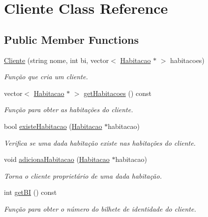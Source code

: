 \hypertarget{class_cliente}{}\section{Cliente Class Reference}
\label{class_cliente}
\subsection*{Public Member Functions}
\begin{DoxyCompactItemize}
\item 
\hyperlink{class_cliente_a2bccaf416e225c0f925e69ec132f415a}{Cliente} (string nome, int bi, vector$<$ \hyperlink{class_habitacao}{Habitacao} $\ast$ $>$ habitacoes)
\begin{DoxyCompactList}\small\item\em Função que cria um cliente. \end{DoxyCompactList}\item 
vector$<$ \hyperlink{class_habitacao}{Habitacao} $\ast$ $>$ \hyperlink{class_cliente_a6625c1bb73828bcaa067f41b7590408f}{get\+Habitacoes} () const 
\begin{DoxyCompactList}\small\item\em Função para obter as habitações do cliente. \end{DoxyCompactList}\item 
bool \hyperlink{class_cliente_a26825ee89b523a84613dd37ec58589a5}{existe\+Habitacao} (\hyperlink{class_habitacao}{Habitacao} $\ast$habitacao)
\begin{DoxyCompactList}\small\item\em Verifica se uma dada habitação existe nas habitações do cliente. \end{DoxyCompactList}\item 
void \hyperlink{class_cliente_a7fafc50727fce6fef1d06e231ed87f3a}{adiciona\+Habitacao} (\hyperlink{class_habitacao}{Habitacao} $\ast$habitacao)
\begin{DoxyCompactList}\small\item\em Torna o cliente proprietário de uma dada habitação. \end{DoxyCompactList}\item 
int \hyperlink{class_cliente_a800f49dc0761b67a61e563ca9a1478a7}{get\+BI} () const 
\begin{DoxyCompactList}\small\item\em Função para obter o número do bilhete de identidade do cliente. \end{DoxyCompactList}\item 

\end{DoxyCompactItemize}

